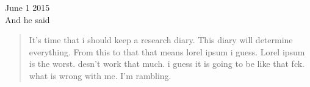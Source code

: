 \documentclass[14pt]{extarticle}
\begin{document}

\title{}

{\Huge June 1 2015 }\\[5mm]


And he said
\blockquote{\small It's time that i should keep a research diary. This diary will determine 
    everything. From this to that that means lorel ipsum i guess. Lorel ipsum is the worst. desn't 
    work that much. i guess it is going to be like that fck. what is wrong with me. I'm rambling.}
\end{document}
